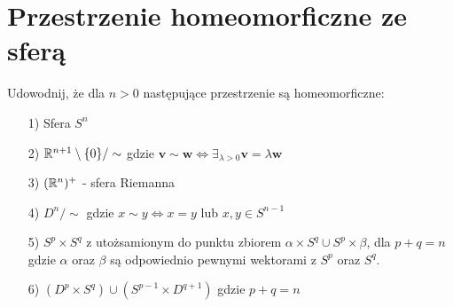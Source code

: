 \section*{Przestrzenie homeomorficzne ze sferą}
Udowodnij, że dla $n > 0$ następujące przestrzenie są homeomorficzne:
\begin{enumerate}
  \item[1)] Sfera $S^n$
  \item[2)] ${\mathbb{R}} ^ {n+1} \setminus \{ 0 \} / \sim $ gdzie $ \mathbf{v} \sim  \mathbf{w} \iff \exists_{\lambda > 0}  \mathbf{v}=  \lambda \mathbf{w} $
  \item[3)] $({\mathbb{R}}^n)^+$ - sfera Riemanna
  \item[4)] $D ^ {n} / \sim $ gdzie $ x \sim y \iff x = y $ lub $ x, y \in S^{n-1} $
  \item[5)] $S^p \times S^q$ z utożsamionym do punktu zbiorem $\alpha \times S^q \cup S^p \times \beta$, dla $p + q = n$ gdzie $\alpha$ oraz $\beta$ są odpowiednio pewnymi wektorami z $S^p$ oraz $S^q$.
  \item[6)] $(D^p \times S^q) \cup (S^{p-1} \times D^{q+1})$ gdzie $p+q = n$
\end{enumerate}
